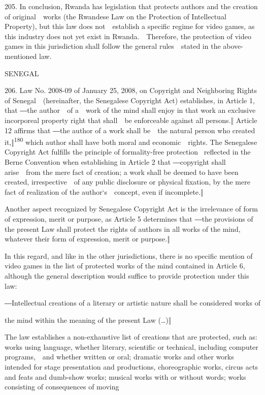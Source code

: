 \documentclass[
]{article}
\begin{document}
{205. }{In conclusion, Rwanda has legislation that protects authors and
the creation of original~~works (the Rwandese }{Law on the Protection of
Intellectual Property)}{, but this law does not~~establish a specific
regime for video games, as this industry does not yet exist in
Rwanda.~~Therefore, the protection of video games in this jurisdiction
shall follow the general rules~~stated in the above-mentioned law.}

{SENEGAL}

{206. }{Law No. 2008-09 of January 25, 2008, on }{Copyright and
Neighboring Rights }{of Senegal~~(hereinafter, the Senegalese
}{Copyright Act}{) establishes, in Article 1, that ―}{the author~~of
a~~work of the mind shall enjoy in that work an exclusive incorporeal
property right that shall~~be enforceable against all persons.}{‖
Article 12 affirms that ―}{the author of a work shall be~~the natural
person who created it,}{‖}\textsuperscript{{180 }}{which author shall
have both moral and economic~~rights. The Senegalese }{Copyright Act
}{fulfills the principle of formality-free protection }{~reflected in
the Berne Convention when establishing in Article 2 that ―}{copyright
shall arise~~from the mere fact of creation; a work shall be deemed to
have been created, irrespective~~of any public disclosure or physical
fixation, by the me}{re fact of realization of the author`s~~concept,
even if incomplete.‖}

{Another aspect recognized by Senegalese }{Copyright Act }{is the
irrelevance of form of expression, merit or purpose, as Article 5
determines that }{―the provisions of the present }{Law shall protect the
rights of authors in all works of the mind, whatever their form of
}{expression, merit or purpose.‖}

{In this regard, and like in the other jurisdictions, there is no
specific mention of video games in the list of protected works of the
mind contained in Article 6, although the general description would
suffice to provide protection under this law:}

{―}{Intellectual creations of a literary or artistic nature shall be
considered works of}

{the mind within the meaning of the present Law (\ldots)‖}

{The law establishes a non-exhaustive list of creations that are
protected, such as: works using language, whether literary, scientific
or technical, including computer programs,~~and whether written or oral;
dramatic works and other works intended for stage presentation and
productions, choreographic works, circus acts and feats and dumb-show
works; musical works with or without words; works consisting of
consequences of moving}
\end{document}
